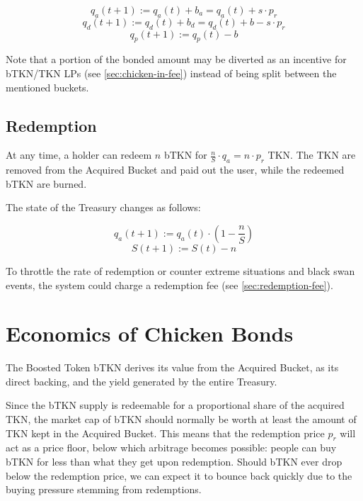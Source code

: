\documentclass{article}
\begin{document}
\begin{equation}
  \label{eq:chicken-in-qa}
    q_a(t+1) := q_a(t) + b_a = q_a(t) + s \cdot p_r
\end{equation}
\begin{equation}
  \label{eq:chicken-in-qd}
    q_d(t+1) := q_d(t) + b_d = q_d(t) + b - s \cdot p_r
\end{equation}
\begin{equation}
  \label{eq:chicken-in-qp}
    q_p(t+1) := q_p(t) - b
\end{equation}

Note that a portion of the bonded amount may be diverted as an incentive for bTKN/TKN LPs (see \ref{sec:chicken-in-fee}) instead of being split between the mentioned buckets.

\subsection{Redemption}
\label{sec:redemption}
At any time, a holder can redeem $n$ bTKN for $\frac{n}{S}\cdot q_a = n \cdot p_r$ TKN.
The TKN are removed from the Acquired Bucket and paid out the user, while the redeemed bTKN are burned.

The state of the Treasury changes as follows: 

\begin{equation}
  \label{eq:redemption-qa}
    q_a(t+1) := q_a(t) \cdot (1 - \frac{n}{S})
\end{equation}
\begin{equation}
  \label{eq:redemption-S}
    S(t+1) := S(t) - n
\end{equation}

To throttle the rate of redemption or counter extreme situations and black swan events, the system could charge a redemption fee (see \ref{sec:redemption-fee}).

\section{Economics of Chicken Bonds}
 \label{sec:economics}
The Boosted Token bTKN derives its value from the Acquired Bucket, as its direct backing, and the yield generated by the entire Treasury.

Since the bTKN supply is redeemable for a proportional share of the acquired TKN, the market cap of bTKN should normally be worth at least the amount of TKN kept in the Acquired Bucket. This means that the redemption price $p_r$ will act as a price floor, below which arbitrage becomes possible: people can buy bTKN for less than what they get upon redemption. Should bTKN ever drop below the redemption price, we can expect it to bounce back quickly due to the buying pressure stemming from redemptions.
\end{document}
